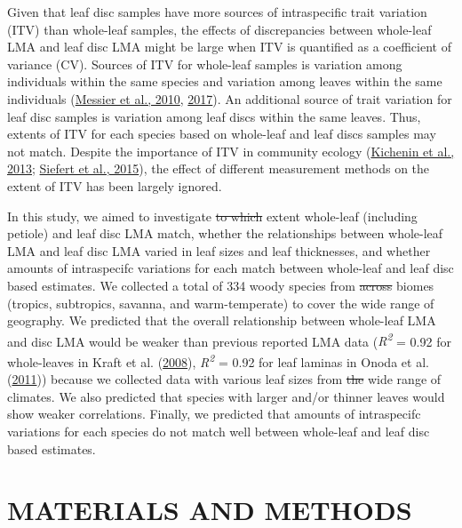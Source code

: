 \documentclass[
  12pt,
  a4paper,
,tablecaptionabove
]{scrartcl}
\providecommand{\DIFaddtex}[1]{{\protect\color{blue}\uwave{#1}}} %
\providecommand{\DIFdeltex}[1]{{\protect\color{red}\sout{#1}}}                      %
\providecommand{\DIFaddbegin}{} %
\providecommand{\DIFaddend}{} %
\providecommand{\DIFdelbegin}{} %
\providecommand{\DIFdelend}{} %
\providecommand{\DIFadd}[1]{\texorpdfstring{\DIFaddtex{#1}}{#1}} %
\providecommand{\DIFdel}[1]{\texorpdfstring{\DIFdeltex{#1}}{}} %
\newcommand{\DIFscaledelfig}{0.5}
\newlength{\DIFdelgraphicswidth} %
\newlength{\DIFdelgraphicsheight} %
\newcommand{\DIFaddincludegraphics}[2][]{{\color{blue}\fbox{\DIFOincludegraphics[#1]{#2}}}} %
\newcommand{\DIFdelincludegraphics}[2][]{%
\sbox{\DIFdelgraphicsbox}{\DIFOincludegraphics[#1]{#2}}%
\settoboxwidth{\DIFdelgraphicswidth}{\DIFdelgraphicsbox} %
\settoboxtotalheight{\DIFdelgraphicsheight}{\DIFdelgraphicsbox} %
\scalebox{\DIFscaledelfig}{%
\parbox[b]{\DIFdelgraphicswidth}{\usebox{\DIFdelgraphicsbox}\\[-\baselineskip] \rule{\DIFdelgraphicswidth}{0em}}\llap{\resizebox{\DIFdelgraphicswidth}{\DIFdelgraphicsheight}{%
\setlength{\unitlength}{\DIFdelgraphicswidth}%
\begin{picture}(1,1)%
\thicklines\linethickness{2pt} %
{\color[rgb]{1,0,0}\put(0,0){\framebox(1,1){}}}%
{\color[rgb]{1,0,0}\put(0,0){\line( 1,1){1}}}%
{\color[rgb]{1,0,0}\put(0,1){\line(1,-1){1}}}%
\end{picture}%
}\hspace*{3pt}}} %
} %
\DeclareRobustCommand{\DIFaddbegin}{\DIFOaddbegin \let\includegraphics\DIFaddincludegraphics} %
\DeclareRobustCommand{\DIFaddend}{\DIFOaddend \let\includegraphics\DIFOincludegraphics} %
\DeclareRobustCommand{\DIFdelbegin}{\DIFOdelbegin \let\includegraphics\DIFdelincludegraphics} %
\DeclareRobustCommand{\DIFdelend}{\DIFOaddend \let\includegraphics\DIFOincludegraphics} %
\begin{document}
Given that leaf disc samples have more sources of intraspecific trait
variation (ITV) than whole-leaf samples, the effects of discrepancies
between whole-leaf LMA and leaf disc LMA might be large when ITV is
quantified as a coefficient of variance (CV). Sources of ITV for
whole-leaf samples is variation among individuals within the same
species and variation among leaves within the same individuals
(\protect\hyperlink{ref-Messier2010}{Messier et al., 2010},
\protect\hyperlink{ref-Messier2017}{2017}). An additional source of
trait variation for leaf disc samples is variation among leaf discs
within the same leaves. Thus, extents of ITV for each species based on
whole-leaf and leaf discs samples may not match. Despite the importance
of ITV in community ecology
(\protect\hyperlink{ref-Kichenin2013}{Kichenin et al., 2013};
\protect\hyperlink{ref-Siefert2015}{Siefert et al., 2015}), the effect
of different measurement methods on the extent of ITV has been largely
ignored.

In this study, we aimed to investigate \DIFdelbegin \DIFdel{to which }\DIFdelend \DIFaddbegin \DIFadd{what }\DIFaddend extent whole-leaf (including
petiole) and leaf disc LMA match, whether the relationships between
whole-leaf LMA and leaf disc LMA varied in leaf sizes and leaf
thicknesses, and whether amounts of intraspecifc variations for each
match between whole-leaf and leaf disc based estimates. We collected a
total of 334 woody species from \DIFdelbegin \DIFdel{across }\DIFdelend \DIFaddbegin \DIFadd{four }\DIFaddend biomes (tropics, subtropics,
savanna, and warm-temperate) to cover the wide range of geography. We
predicted that the overall relationship between whole-leaf LMA and disc
LMA would be weaker than previous reported LMA data
(\emph{R\textsuperscript{2}} = 0.92 for whole-leaves in Kraft et al.
(\protect\hyperlink{ref-Kraft2008}{2008}), \emph{R\textsuperscript{2}} =
0.92 for leaf laminas in Onoda et al.
(\protect\hyperlink{ref-Onoda2011}{2011})) because we collected data
with various leaf sizes from \DIFdelbegin \DIFdel{the }\DIFdelend \DIFaddbegin \DIFadd{a }\DIFaddend wide range of climates. We also predicted
that species with larger and/or thinner leaves would show weaker
correlations. Finally, we predicted that amounts of intraspecifc
variations for each species do not match well between whole-leaf and
leaf disc based estimates.

\hypertarget{materials-and-methods}{%
\section{MATERIALS AND METHODS}\label{materials-and-methods}}
\end{document}
